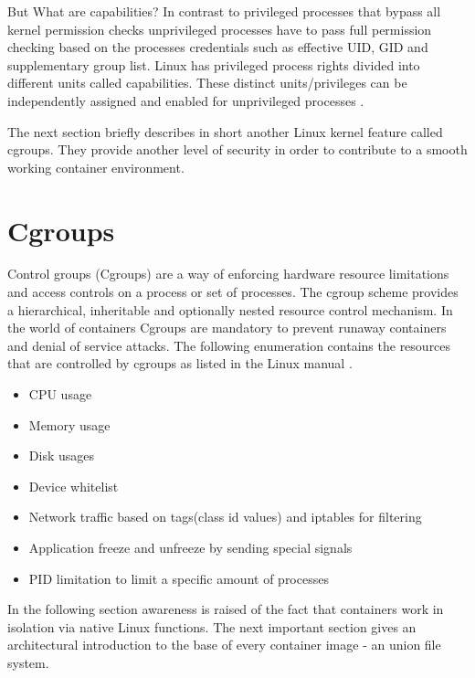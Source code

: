 But What are capabilities? In contrast to privileged processes that bypass all kernel permission checks unprivileged processes have to pass full permission checking based on the processes credentials such as effective UID, GID and supplementary group list. 
Linux has privileged process rights divided into different units called capabilities. These distinct units/privileges can be independently assigned and enabled for unprivileged processes \cite{capa}.

The next section briefly describes in short another Linux kernel feature called cgroups. 
They provide another level of security in order to contribute to a smooth working container environment.

\section{Cgroups}
\label{sec:intro:containerization:cgroups}
Control groups (Cgroups) are a way of enforcing hardware resource limitations and access controls on a process or set of processes. 
The cgroup scheme provides a hierarchical, inheritable and optionally nested resource control mechanism.
In the world of containers Cgroups are mandatory to prevent runaway containers and denial of service attacks.
The following enumeration contains the resources that are controlled by cgroups as listed in the Linux manual \cite{capa}.
\begin{itemize}
\item CPU usage
\item Memory usage
\item Disk usages
\item Device whitelist
\item Network traffic based on tags(class id values) and iptables for filtering
\item Application freeze and unfreeze by sending special signals
\item PID limitation to limit a specific amount of processes 
\end{itemize}

In the following section awareness is raised of the fact that containers work in isolation via native Linux functions.
The next important section gives an architectural introduction to the base of every container image - an union file system.
